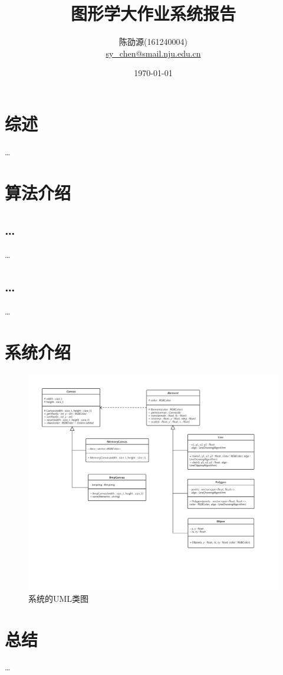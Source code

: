 \documentclass[a4paper,12pt]{article}
\title{图形学大作业系统报告}
\author{陈劭源(161240004) \\ \href{mailto:sy\_chen@smail.nju.edu.cn}{sy\_chen@smail.nju.edu.cn}}
\date{\today}
\begin{document}
\maketitle

\section{综述}
\dots

\section{算法介绍}
\subsection{\dots}
\dots\cite{Aspnes:1973}
\subsection{\dots}
\dots
		
\section{系统介绍}
\begin{figure}
\centering
\includegraphics[width=\linewidth]{uml.pdf}
\caption{系统的UML类图}
\end{figure}
\section{总结}
\dots

%

\end{document}
